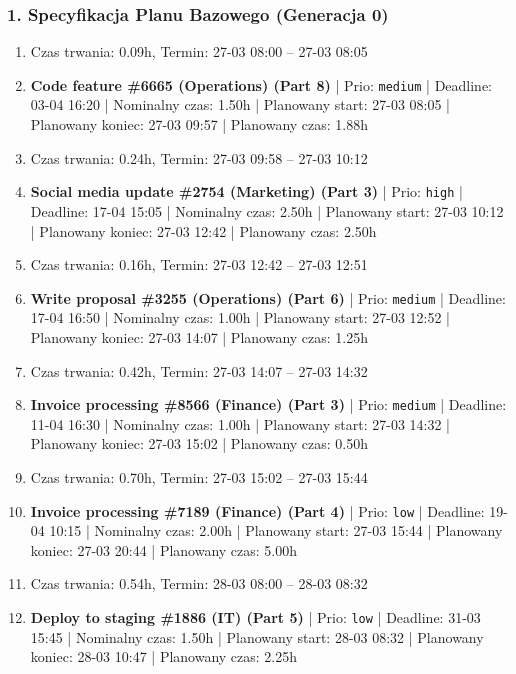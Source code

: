 \subsubsection*{1. Specyfikacja Planu Bazowego (Generacja 0)}
{\small
\begin{enumerate}
  \item [\textbf{PRZERWA}] Czas trwania: 0.09h, Termin: 27-03 08:00 -- 27-03 08:05
  \item [\textbf{14667}] \textbf{Code feature \#6665 (Operations) (Part 8)} | Prio: \texttt{medium} | Deadline: 03-04 16:20 | Nominalny czas: 1.50h | Planowany start: 27-03 08:05 | Planowany koniec: 27-03 09:57 | Planowany czas: 1.88h
  \item [\textbf{PRZERWA}] Czas trwania: 0.24h, Termin: 27-03 09:58 -- 27-03 10:12
  \item [\textbf{14611}] \textbf{Social media update \#2754 (Marketing) (Part 3)} | Prio: \texttt{high} | Deadline: 17-04 15:05 | Nominalny czas: 2.50h | Planowany start: 27-03 10:12 | Planowany koniec: 27-03 12:42 | Planowany czas: 2.50h
  \item [\textbf{PRZERWA}] Czas trwania: 0.16h, Termin: 27-03 12:42 -- 27-03 12:51
  \item [\textbf{14654}] \textbf{Write proposal \#3255 (Operations) (Part 6)} | Prio: \texttt{medium} | Deadline: 17-04 16:50 | Nominalny czas: 1.00h | Planowany start: 27-03 12:52 | Planowany koniec: 27-03 14:07 | Planowany czas: 1.25h
  \item [\textbf{PRZERWA}] Czas trwania: 0.42h, Termin: 27-03 14:07 -- 27-03 14:32
  \item [\textbf{14675}] \textbf{Invoice processing \#8566 (Finance) (Part 3)} | Prio: \texttt{medium} | Deadline: 11-04 16:30 | Nominalny czas: 1.00h | Planowany start: 27-03 14:32 | Planowany koniec: 27-03 15:02 | Planowany czas: 0.50h
  \item [\textbf{PRZERWA}] Czas trwania: 0.70h, Termin: 27-03 15:02 -- 27-03 15:44
  \item [\textbf{14678}] \textbf{Invoice processing \#7189 (Finance) (Part 4)} | Prio: \texttt{low} | Deadline: 19-04 10:15 | Nominalny czas: 2.00h | Planowany start: 27-03 15:44 | Planowany koniec: 27-03 20:44 | Planowany czas: 5.00h
  \item [\textbf{PRZERWA}] Czas trwania: 0.54h, Termin: 28-03 08:00 -- 28-03 08:32
  \item [\textbf{14697}] \textbf{Deploy to staging \#1886 (IT) (Part 5)} | Prio: \texttt{low} | Deadline: 31-03 15:45 | Nominalny czas: 1.50h | Planowany start: 28-03 08:32 | Planowany koniec: 28-03 10:47 | Planowany czas: 2.25h

\end{enumerate}}
